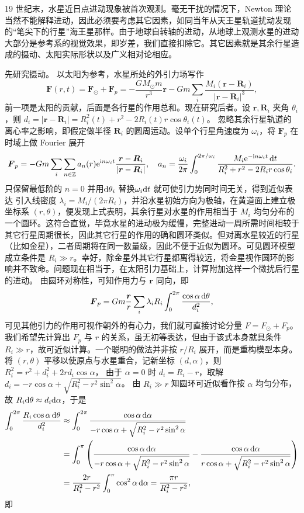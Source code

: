 19 世纪末，水星近日点进动现象被首次观测。毫无干扰的情况下，Newton 理论当然不能解释进动，因此必须要考虑其它因素，如同当年从天王星轨道扰动发现的“笔尖下的行星”海王星那样。由于地球自转轴的进动，从地球上观测水星的进动大部分是参考系的视觉效果，即岁差，我们直接扣除它。其它因素就是其余行星造成的摄动、太阳实际形状以及广义相对论相应。


先研究摄动。
以太阳为参考，水星所处的外引力场写作
\[\bm F(r,t)=\bm F_\odot+\bm F_p=-\frac{{G{M_\odot}m}}{r^3}\bm r-Gm\sum_i\frac{M_i(\bm r-\bm R_i)}{|\bm r-\bm R_i|^3},\]
前一项是太阳的贡献，后面是各行星的作用总和。现在研究后者。设 $\bm r,\bm R_i$ 夹角 $\theta_i$，则 $d_i=|\bm r-\bm R_i|=R_i^2(t)+r^2-2R_i(t)r\cos\theta_i(t)$。
忽略其余行星轨道的离心率之影响，即假定做半径 $\bm R_i$ 的圆周运动。设单个行星角速度为 $\omega_i$，将 $\bm F_p$ 在时域上做 Fourier 展开
\[
\vb* F_p=- Gm\sum_i \sum_{n\in\mathbb{Z}} {{a_n}(r){\mathrm{e}^{\mathrm{i} n{\omega_i}t}}}\frac{\vb* r-\vb* R_i}{|\vb* r-\vb* R_i|},\quad a_n=\frac{\omega_i}{2\pi}\int_0^{2\pi/\omega_i}{\frac{{M_i\mathrm{e}^{-\mathrm{i} n\omega_i t}\,\dd t}}{{R_i^2 + r^2 - 2R_ir\cos \theta_i}}}.
\]
只保留最低阶的 $n=0$ 并用$\dd\theta_i$ 替换$\omega_i\dd t$ 就可使引力势同时间无关，得到近似表达
引入线密度 $\lambda_i=M_i/(2\pi R_i)$，并沿水星初始方向为极轴，在黄道面上建立极坐标系 $(r,\theta)$，便发现上式表明，其余行星对水星的作用相当于 $M_i$ 均匀分布的一个圆环。这符合直觉，毕竟水星的进动极为缓慢，完整进动一周所需时间相较于其它行星周期很长，因此其它行星的作用的确和圆环类似。但对离水星较近的行星（比如金星），二者周期将在同一数量级，因此不便于近似为圆环。可见圆环模型成立条件是 $R_i\gg r$。幸好，除金星外其它行星都离得较远，将金星视作圆环的影响并不致命。问题现在相当于，在太阳引力基础上，计算附加这样一个微扰后行星的进动。
由圆环对称性，可知作用力与 $\bm r$ 同向，即
\[
\vb* F_p= Gm\frac{\vb* r}{r}\sum_i  \lambda_iR_i\int_0^{2\pi } \frac{\cos\alpha\,\dd\theta}{ d_i^2},
\]
可见其他引力的作用可视作朝外的有心力，我们就可直接讨论分量 $F=F_\odot+F_p$。
我们希望先计算出 $F_p$ 与 $r$ 的关系，虽无初等表达，但由于该式本身就具条件 $R_i\gg r$，故可近似计算。一个聪明的做法并非按 $r/R_i$ 展开，而是重构模型本身。将 $(r,\theta)$ 平移以使原点与水星重合，记新坐标 $(d,\alpha)$，则 $R_i^2=r^2+d_i^2+2rd_i\cos\alpha$，
由于 $\alpha=0$ 时 $d_i=R_i-r$，取解 $d_i=-r\cos\alpha+\sqrt{R_i^2-r^2\sin^2\alpha}$。
由 $R_i\gg r$ 知圆环可近似看作按 $\alpha$ 均匀分布，故 $ R_i\dd\theta\approx d_i\dd\alpha$，于是
\begin{align*}
    \int_0^{2\pi } \frac{R_i\cos\alpha\,\dd\theta}{ d_i^2 }&\approx \int_0^{2\pi } \frac{\cos\alpha\dd{\alpha}}{-r\cos\alpha+\sqrt{R_i^2-r^2\sin^2\alpha}}\\
    &=\int_0^{\pi } \left(\frac{\cos\alpha\dd{\alpha}}{-r\cos\alpha+\sqrt{R_i^2-r^2\sin^2\alpha}}-\frac{\cos\alpha\dd{\alpha}}{r\cos\alpha+\sqrt{R_i^2-r^2\sin^2\alpha}}\right)\\
    &=\frac{2r}{R_i^2-r^2} \int_0^{\pi }\cos^2\alpha\dd{\alpha}=\frac{\pi r}{R_i^2-r^2},
\end{align*}
即

